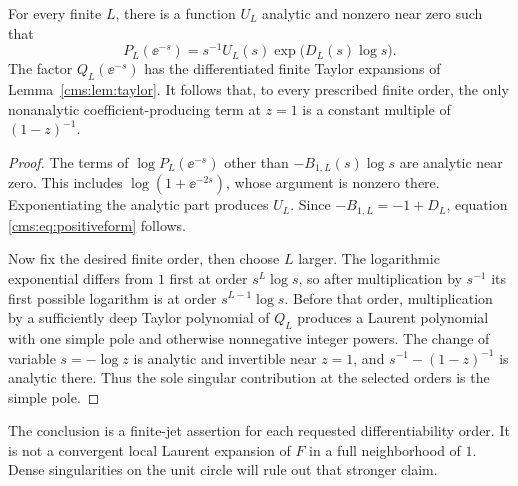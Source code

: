 \begin{proposition}\label{cms:prop:positive}
For every finite $L$, there is a function $U_L$ analytic and nonzero near zero such that
\begin{equation}\label{cms:eq:positiveform}
P_L(\ee^{-s})=s^{-1}U_L(s)
 \exp\bigl(D_L(s)\log s\bigr).
\end{equation}
The factor $Q_L(\ee^{-s})$ has the differentiated finite Taylor expansions of Lemma~\ref{cms:lem:taylor}. It follows that, to every prescribed finite order, the only nonanalytic coefficient-producing term at $z=1$ is a constant multiple of $(1-z)^{-1}$.
\end{proposition}
\begin{proof}
The terms of $\log P_L(\ee^{-s})$ other than $-B_{1,L}(s)\log s$ are analytic near zero. This includes $\log(1+\ee^{-2s})$, whose argument is nonzero there. Exponentiating the analytic part produces $U_L$. Since $-B_{1,L}=-1+D_L$, equation \eqref{cms:eq:positiveform} follows.

Now fix the desired finite order, then choose $L$ larger. The logarithmic exponential differs from $1$ first at order $s^L\log s$, so after multiplication by $s^{-1}$ its first possible logarithm is at order $s^{L-1}\log s$. Before that order, multiplication by a sufficiently deep Taylor polynomial of $Q_L$ produces a Laurent polynomial with one simple pole and otherwise nonnegative integer powers. The change of variable $s=-\log z$ is analytic and invertible near $z=1$, and $s^{-1}-(1-z)^{-1}$ is analytic there. Thus the sole singular contribution at the selected orders is the simple pole.
\end{proof}

The conclusion is a finite-jet assertion for each requested differentiability order. It is not a convergent local Laurent expansion of $F$ in a full neighborhood of $1$. Dense singularities on the unit circle will rule out that stronger claim.

